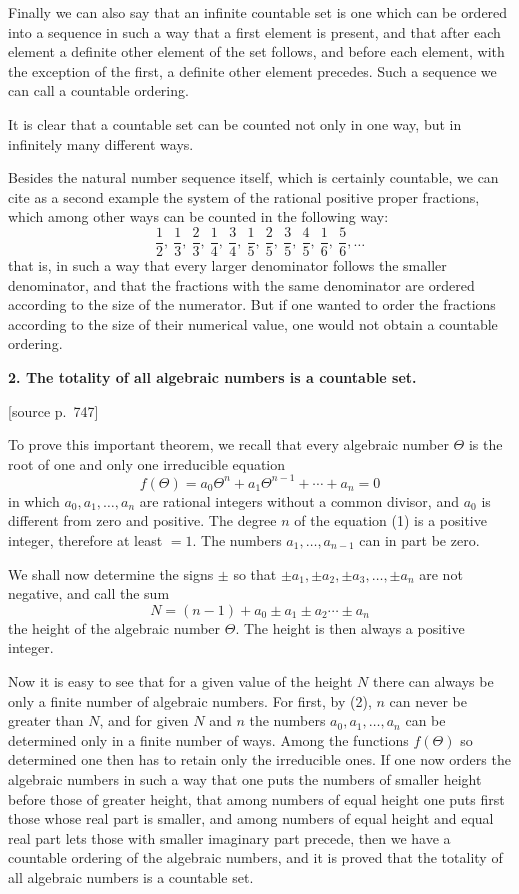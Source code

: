 \documentclass[11pt]{article}
\newcommand{\srcpage}[1]{\par\medskip\noindent\textsf{[source p.~#1]}\par\smallskip}
\begin{document}
Finally we can also say that an infinite countable set is one which can be ordered into a sequence in such a way that a first element is present, and that after each element a definite other element of the set follows, and before each element, with the exception of the first, a definite other element precedes. Such a sequence we can call a countable ordering.

It is clear that a countable set can be counted not only in one way, but in infinitely many different ways.

Besides the natural number sequence itself, which is certainly countable, we can cite as a second example the system of the rational positive proper fractions, which among other ways can be counted in the following way:
\[
\frac12,\ \frac13,\ \frac23,\ \frac14,\ \frac34,\ \frac15,\ \frac25,\ \frac35,\ \frac45,\ \frac16,\ \frac56,\ldots
\]
that is, in such a way that every larger denominator follows the smaller denominator, and that the fractions with the same denominator are ordered according to the size of the numerator. But if one wanted to order the fractions according to the size of their numerical value, one would not obtain a countable ordering.

\textbf{2. The totality of all algebraic numbers is a countable set.}

\srcpage{747}
To prove this important theorem, we recall that every algebraic number $\Theta$ is the root of one and only one irreducible equation
\begin{equation}\tag{1}
f(\Theta)=a_0\Theta^n+a_1\Theta^{n-1}+\cdots+a_n=0
\end{equation}
in which $a_0,a_1,\ldots,a_n$ are rational integers without a common divisor, and $a_0$ is different from zero and positive. The degree $n$ of the equation (1) is a positive integer, therefore at least $=1$. The numbers $a_1,\ldots,a_{n-1}$ can in part be zero.

We shall now determine the signs $\pm$ so that $\pm a_1,\pm a_2,\pm a_3,\ldots,\pm a_n$ are not negative, and call the sum
\begin{equation}\tag{2}
N=(n-1)+a_0\pm a_1\pm a_2\cdots\pm a_n
\end{equation}
the height of the algebraic number $\Theta$. The height is then always a positive integer.

Now it is easy to see that for a given value of the height $N$ there can always be only a finite number of algebraic numbers. For first, by (2), $n$ can never be greater than $N$, and for given $N$ and $n$ the numbers $a_0,a_1,\ldots,a_n$ can be determined only in a finite number of ways. Among the functions $f(\Theta)$ so determined one then has to retain only the irreducible ones. If one now orders the algebraic numbers in such a way that one puts the numbers of smaller height before those of greater height, that among numbers of equal height one puts first those whose real part is smaller, and among numbers of equal height and equal real part lets those with smaller imaginary part precede, then we have a countable ordering of the algebraic numbers, and it is proved that the totality of all algebraic numbers is a countable set.
\end{document}
